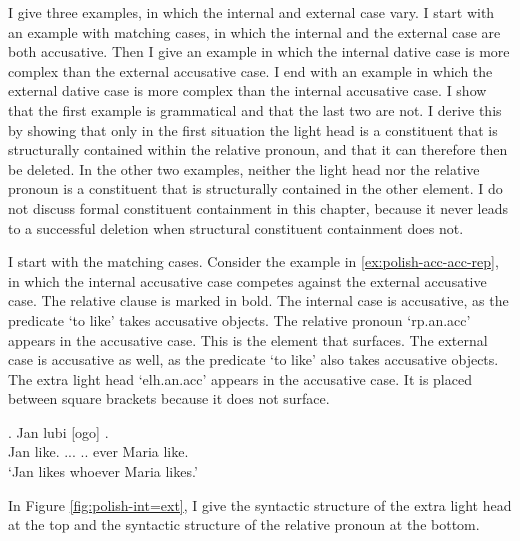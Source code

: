 I give three examples, in which the internal and external case vary.
I start with an example with matching cases, in which the internal and the external case are both accusative.
Then I give an example in which the internal dative case is more complex than the external accusative case.
I end with an example in which the external dative case is more complex than the internal accusative case.
I show that the first example is grammatical and that the last two are not. I derive this by showing that only in the first situation the light head is a constituent that is structurally contained within the relative pronoun, and that it can therefore then be deleted.
In the other two examples, neither the light head nor the relative pronoun is a constituent that is structurally contained in the other element.
I do not discuss formal constituent containment in this chapter, because it never leads to a successful deletion when structural constituent containment does not.

I start with the matching cases.
Consider the example in \ref{ex:polish-acc-acc-rep}, in which the internal accusative case competes against the external accusative case. The relative clause is marked in bold.
The internal case is accusative, as the predicate  `to like' takes accusative objects. The relative pronoun  `\ac{rp}.\ac{an}.\ac{acc}' appears in the accusative case. This is the element that surfaces.
The external case is accusative as well, as the predicate  `to like' also takes accusative objects. The extra light head  `\ac{elh}.\ac{an}.\ac{acc}' appears in the accusative case. It is placed between square brackets because it does not surface.

\exg. Jan lubi [ogo]    .\\
 Jan like.\scsub{[acc]} ...  .. ever Maria like.\scsub{[acc]}\\
 `Jan likes whoever Maria likes.' \label{ex:polish-acc-acc-rep}

In Figure \ref{fig:polish-int=ext}, I give the syntactic structure of the extra light head at the top and the syntactic structure of the relative pronoun at the bottom.

